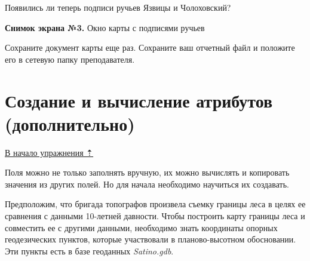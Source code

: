 \documentclass[]{book}
\theoremstyle{definition}
\theoremstyle{definition}
\theoremstyle{definition}
\theoremstyle{remark}
\begin{document}
Появились ли теперь подписи ручьев Язвицы и Чолоховский?

\textbf{Снимок экрана №3.} Окно карты с подписями ручьев

Сохраните документ карты еще раз. Сохраните ваш отчетный файл и положите
его в сетевую папку преподавателя.

\hypertarget{map-design-quaternary-calculation}{%
\section{Создание и вычисление атрибутов
(дополнительно)}\label{map-design-quaternary-calculation}}

\protect\hyperlink{map-design-quaternary}{В начало упражнения ⇡}

Поля можно не только заполнять вручную, их можно вычислять и копировать
значения из других полей. Но для начала необходимо научиться их
создавать.

Предположим, что бригада топографов произвела съемку границы леса в
целях ее сравнения с данными 10-летней давности. Чтобы построить карту
границы леса и совместить ее с другими данными, необходимо знать
координаты опорных геодезических пунктов, которые участвовали в
планово-высотном обосновании. Эти пункты есть в базе геоданных
\emph{Satino.gdb}.
\end{document}

